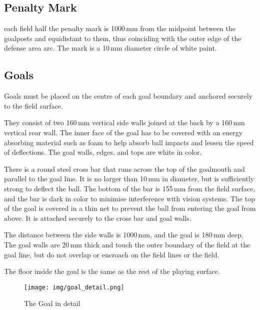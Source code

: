 \subsection{Penalty Mark}
 each field half the penalty mark is
1000\,mm from the midpoint between the goalposts and equidistant to them, thus
coinciding with the outer edge of the defense area arc.
The mark is a 10\,mm diameter circle of white paint.

\subsection{Goals}
Goals must be placed on the centre of each goal boundary and anchored
securely to the field surface.

They consist of two 160\,mm vertical side walls joined at the back by a 160\,mm
vertical rear wall. The inner face of the goal has to be covered with an energy
absorbing material such as foam to help absorb ball impacts and lessen the speed
of deflections.
The goal walls, edges, and tops are white in color.

There is a round steel cross bar that runs across the top of the goalmouth and
parallel to the goal line. It is no larger than 10\,mm in diameter, but is
sufficiently strong to deflect the ball. The bottom of the bar is 155\,mm from
the field surface, and the bar is dark in color to minimise interference with
vision systems. The top of the goal is covered in a thin net to prevent the ball
from entering the goal from above. It is attached securely to the cross bar and
goal walls.

The distance between the side walls is 1000\,mm, and the goal is 180\,mm deep.
The goal walls are 20\,mm thick and touch the outer boundary of the field at
the goal line, but do not overlap or encroach on the field lines or the field.

The floor inside the goal is the same as the rest of the playing surface.

\begin{figure}[ht] %
  \centering
  \texttt{[image: img/goal\_detail.png]}
  \caption{The Goal in detail}
  \label{fig:sslgoal}
\end{figure}

